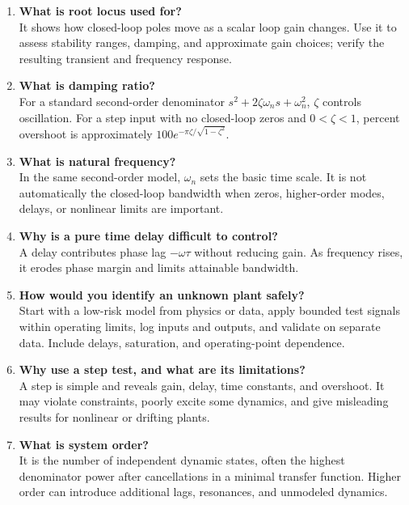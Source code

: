 \documentclass[11pt]{article}
\begin{document}
\begin{enumerate}
\item \textbf{What is root locus used for?}\\
It shows how closed-loop poles move as a scalar loop gain changes. Use it to assess stability ranges, damping, and approximate gain choices; verify the resulting transient and frequency response.

\item \textbf{What is damping ratio?}\\
For a standard second-order denominator $s^2+2\zeta\omega_ns+\omega_n^2$, $\zeta$ controls oscillation. For a step input with no closed-loop zeros and $0<\zeta<1$, percent overshoot is approximately $100e^{-\pi\zeta/\sqrt{1-\zeta^2}}$.

\item \textbf{What is natural frequency?}\\
In the same second-order model, $\omega_n$ sets the basic time scale. It is not automatically the closed-loop bandwidth when zeros, higher-order modes, delays, or nonlinear limits are important.

\item \textbf{Why is a pure time delay difficult to control?}\\
A delay contributes phase lag $-\omega\tau$ without reducing gain. As frequency rises, it erodes phase margin and limits attainable bandwidth.

\item \textbf{How would you identify an unknown plant safely?}\\
Start with a low-risk model from physics or data, apply bounded test signals within operating limits, log inputs and outputs, and validate on separate data. Include delays, saturation, and operating-point dependence.

\item \textbf{Why use a step test, and what are its limitations?}\\
A step is simple and reveals gain, delay, time constants, and overshoot. It may violate constraints, poorly excite some dynamics, and give misleading results for nonlinear or drifting plants.

\item \textbf{What is system order?}\\
It is the number of independent dynamic states, often the highest denominator power after cancellations in a minimal transfer function. Higher order can introduce additional lags, resonances, and unmodeled dynamics.


\end{enumerate}
\end{document}
